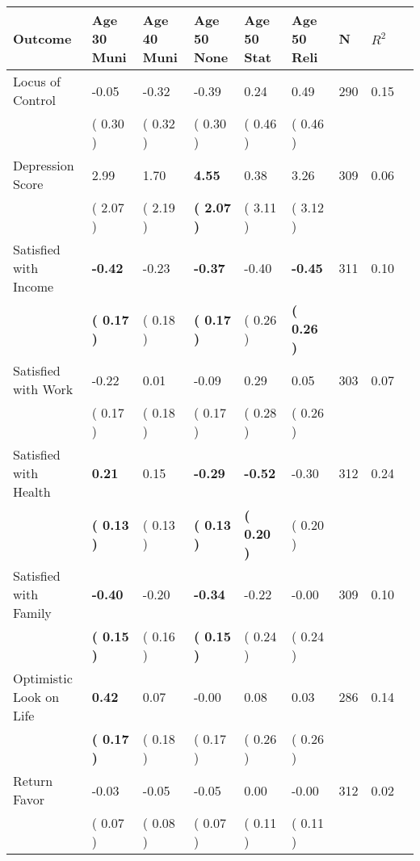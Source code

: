 \begin{tabular}{L{6.2cm} C{1.8cm} C{1.8cm} C{1.8cm} C{1.8cm} C{1.8cm} C{1.8cm} C{0.3cm} C{0.3cm}}
\toprule
 \textbf{Outcome} & \textbf{Age 30 Muni} & \textbf{Age 40 Muni} & \textbf{Age 50 None} & \textbf{Age 50 Stat} & \textbf{Age 50 Reli} & \textbf{N} & \textbf{$ R^2$} \\
\midrule
Locus of Control &     -0.05 &     -0.32 &     -0.39 &      0.24 &      0.49  & 290 &       0.15 \\ 
 & (     0.30 ) & (     0.32 ) & (     0.30 ) & (     0.46 ) & (     0.46 )  & \\
Depression Score &      2.99 &      1.70 & \textbf{     4.55} &      0.38 &      3.26  & 309 &       0.06 \\ 
 & (     2.07 ) & (     2.19 ) & \textbf{(     2.07 )} & (     3.11 ) & (     3.12 )  & \\
Satisfied with Income & \textbf{    -0.42} &     -0.23 & \textbf{    -0.37} &     -0.40 & \textbf{    -0.45}  & 311 &       0.10 \\ 
 & \textbf{(     0.17 )} & (     0.18 ) & \textbf{(     0.17 )} & (     0.26 ) & \textbf{(     0.26 )}  & \\
Satisfied with Work &     -0.22 &      0.01 &     -0.09 &      0.29 &      0.05  & 303 &       0.07 \\ 
 & (     0.17 ) & (     0.18 ) & (     0.17 ) & (     0.28 ) & (     0.26 )  & \\
Satisfied with Health & \textbf{     0.21} &      0.15 & \textbf{    -0.29} & \textbf{    -0.52} &     -0.30  & 312 &       0.24 \\ 
 & \textbf{(     0.13 )} & (     0.13 ) & \textbf{(     0.13 )} & \textbf{(     0.20 )} & (     0.20 )  & \\
Satisfied with Family & \textbf{    -0.40} &     -0.20 & \textbf{    -0.34} &     -0.22 &     -0.00  & 309 &       0.10 \\ 
 & \textbf{(     0.15 )} & (     0.16 ) & \textbf{(     0.15 )} & (     0.24 ) & (     0.24 )  & \\
Optimistic Look on Life & \textbf{     0.42} &      0.07 &     -0.00 &      0.08 &      0.03  & 286 &       0.14 \\ 
 & \textbf{(     0.17 )} & (     0.18 ) & (     0.17 ) & (     0.26 ) & (     0.26 )  & \\
Return Favor &     -0.03 &     -0.05 &     -0.05 &      0.00 &     -0.00  & 312 &       0.02 \\ 
 & (     0.07 ) & (     0.08 ) & (     0.07 ) & (     0.11 ) & (     0.11 )  & \\

\end{tabular}
